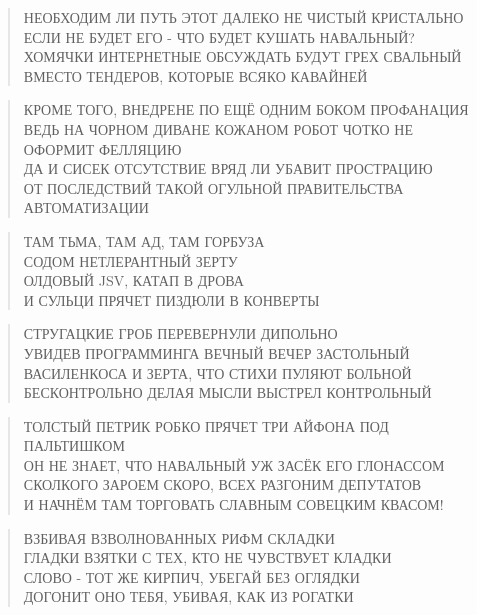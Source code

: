 \poemtitle{***}
\begin{verse}
НЕОБХОДИМ ЛИ ПУТЬ ЭТОТ ДАЛЕКО НЕ ЧИСТЫЙ КРИСТАЛЬНО\\
ЕСЛИ НЕ БУДЕТ ЕГО - ЧТО БУДЕТ КУШАТЬ НАВАЛЬНЫЙ?\\
ХОМЯЧКИ ИНТЕРНЕТНЫЕ ОБСУЖДАТЬ БУДУТ ГРЕХ СВАЛЬНЫЙ\\
ВМЕСТО ТЕНДЕРОВ, КОТОРЫЕ ВСЯКО КАВАЙНЕЙ
\end{verse}

\poemtitle{***}
\begin{verse}
КРОМЕ ТОГО, ВНЕДРЕНЕ ПО ЕЩЁ ОДНИМ БОКОМ ПРОФАНАЦИЯ\\
ВЕДЬ НА ЧОРНОМ ДИВАНЕ КОЖАНОМ РОБОТ ЧОТКО НЕ ОФОРМИТ ФЕЛЛЯЦИЮ\\
ДА И СИСЕК ОТСУТСТВИЕ ВРЯД ЛИ УБАВИТ ПРОСТРАЦИЮ\\
ОТ ПОСЛЕДСТВИЙ ТАКОЙ ОГУЛЬНОЙ ПРАВИТЕЛЬСТВА АВТОМАТИЗАЦИИ
\end{verse}

\poemtitle{***}
\begin{verse}
ТАМ ТЬМА, ТАМ АД, ТАМ ГОРБУЗА\\
СОДОМ НЕТЛЕРАНТНЫЙ ЗЕРТУ\\
ОЛДОВЫЙ JSV, КАТАП В ДРОВА\\
И СУЛЬЦИ ПРЯЧЕТ ПИЗДЮЛИ В КОНВЕРТЫ
\end{verse}

\poemtitle{***}
\begin{verse}
СТРУГАЦКИЕ ГРОБ ПЕРЕВЕРНУЛИ ДИПОЛЬНО\\
УВИДЕВ ПРОГРАММИНГА ВЕЧНЫЙ ВЕЧЕР ЗАСТОЛЬНЫЙ\\
ВАСИЛЕНКОСА И ЗЕРТА, ЧТО СТИХИ ПУЛЯЮТ БОЛЬНОЙ\\
БЕСКОНТРОЛЬНО ДЕЛАЯ МЫСЛИ ВЫСТРЕЛ КОНТРОЛЬНЫЙ
\end{verse}

\poemtitle{***}
\begin{verse}
ТОЛСТЫЙ ПЕТРИК РОБКО ПРЯЧЕТ ТРИ АЙФОНА ПОД ПАЛЬТИШКОМ\\
ОН НЕ ЗНАЕТ, ЧТО НАВАЛЬНЫЙ УЖ ЗАСЁК ЕГО ГЛОНАССОМ\\
СКОЛКОГО ЗАРОЕМ СКОРО, ВСЕХ РАЗГОНИМ ДЕПУТАТОВ\\
И НАЧНЁМ ТАМ ТОРГОВАТЬ СЛАВНЫМ СОВЕЦКИМ КВАСОМ!
\end{verse}

\poemtitle{***}
\begin{verse}
ВЗБИВАЯ ВЗВОЛНОВАННЫХ РИФМ СКЛАДКИ\\
ГЛАДКИ ВЗЯТКИ С ТЕХ, КТО НЕ ЧУВСТВУЕТ КЛАДКИ\\
СЛОВО - ТОТ ЖЕ КИРПИЧ, УБЕГАЙ БЕЗ ОГЛЯДКИ\\
ДОГОНИТ ОНО ТЕБЯ, УБИВАЯ, КАК ИЗ РОГАТКИ
\end{verse}

